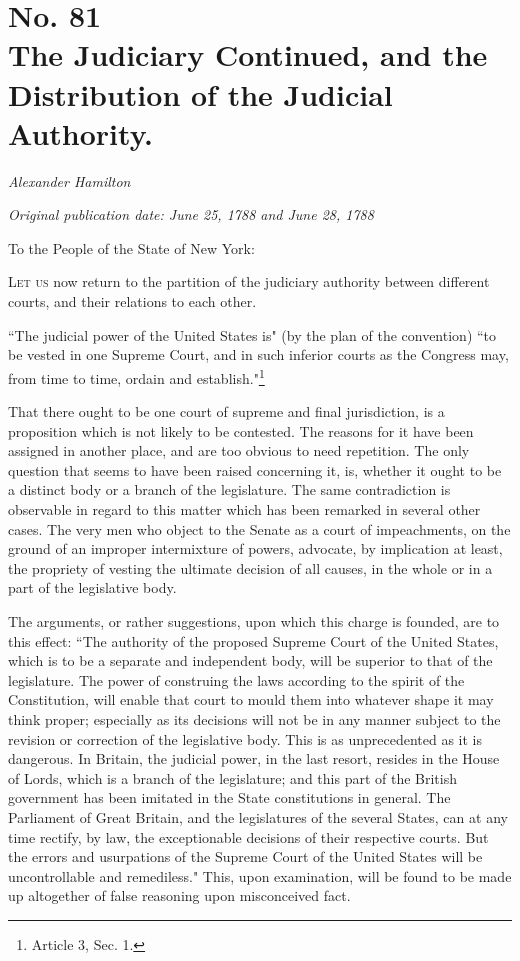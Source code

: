\chapter[No. 81: The Judiciary Continued, and the Distribution of the Judicial Authority.]{No. 81\\ {\small The Judiciary Continued, and the Distribution of the Judicial Authority.}}

\textit{Alexander Hamilton}

\textit{Original publication date: June 25, 1788 and June 28, 1788}
\vspace{1cm}

To the People of the State of New York:
\vspace{.4cm}

\textsc{Let us} now return to the partition of the judiciary authority between different courts, and their relations to each other.

``The judicial power of the United States is" (by the plan of the convention) ``to be vested in one Supreme Court, and in such inferior courts as the Congress may, from time to time, ordain and establish."\footnote{Article 3, Sec. 
1.}

That there ought to be one court of supreme and final jurisdiction, is a proposition which is not likely to be contested. 
The reasons for it have been assigned in another place, and are too obvious to need repetition. 
The only question that seems to have been raised concerning it, is, whether it ought to be a distinct body or a branch of the legislature. 
The same contradiction is observable in regard to this matter which has been remarked in several other cases. 
The very men who object to the Senate as a court of impeachments, on the ground of an improper intermixture of powers, advocate, by implication at least, the propriety of vesting the ultimate decision of all causes, in the whole or in a part of the legislative body.

The arguments, or rather suggestions, upon which this charge is founded, are to this effect: ``The authority of the proposed Supreme Court of the United States, which is to be a separate and independent body, will be superior to that of the legislature. 
The power of construing the laws according to the spirit of the Constitution, will enable that court to mould them into whatever shape it may think proper; especially as its decisions will not be in any manner subject to the revision or correction of the legislative body. 
This is as unprecedented as it is dangerous. 
In Britain, the judicial power, in the last resort, resides in the House of Lords, which is a branch of the legislature; and this part of the British government has been imitated in the State constitutions in general. 
The Parliament of Great Britain, and the legislatures of the several States, can at any time rectify, by law, the exceptionable decisions of their respective courts. 
But the errors and usurpations of the Supreme Court of the United States will be uncontrollable and remediless." This, upon examination, will be found to be made up altogether of false reasoning upon misconceived fact.

